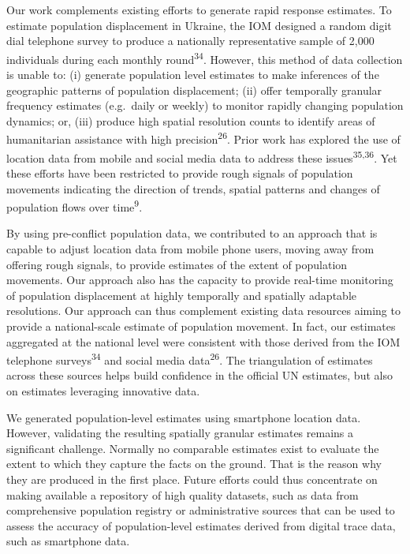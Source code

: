 \documentclass[
  11pt,
]{article}
\begin{document}
Our work complements existing efforts to generate rapid response
estimates. To estimate population displacement in Ukraine, the IOM
designed a random digit dial telephone survey to produce a nationally
representative sample of 2,000 individuals during each monthly
round\textsuperscript{34}. However, this method of data collection is
unable to: (i) generate population level estimates to make inferences of
the geographic patterns of population displacement; (ii) offer
temporally granular frequency estimates (e.g.~daily or weekly) to
monitor rapidly changing population dynamics; or, (iii) produce high
spatial resolution counts to identify areas of humanitarian assistance
with high precision\textsuperscript{26}. Prior work has explored the use
of location data from mobile and social media data to address these
issues\textsuperscript{35,36}. Yet these efforts have been restricted to
provide rough signals of population movements indicating the direction
of trends, spatial patterns and changes of population flows over
time\textsuperscript{9}.

By using pre-conflict population data, we contributed to an approach
that is capable to adjust location data from mobile phone users, moving
away from offering rough signals, to provide estimates of the extent of
population movements. Our approach also has the capacity to provide
real-time monitoring of population displacement at highly temporally and
spatially adaptable resolutions. Our approach can thus complement
existing data resources aiming to provide a national-scale estimate of
population movement. In fact, our estimates aggregated at the national
level were consistent with those derived from the IOM telephone
surveys\textsuperscript{34} and social media data\textsuperscript{26}.
The triangulation of estimates across these sources helps build
confidence in the official UN estimates, but also on estimates
leveraging innovative data.

We generated population-level estimates using smartphone location data.
However, validating the resulting spatially granular estimates remains a
significant challenge. Normally no comparable estimates exist to
evaluate the extent to which they capture the facts on the ground. That
is the reason why they are produced in the first place. Future efforts
could thus concentrate on making available a repository of high quality
datasets, such as data from comprehensive population registry or
administrative sources that can be used to assess the accuracy of
population-level estimates derived from digital trace data, such as
smartphone data.
\end{document}
